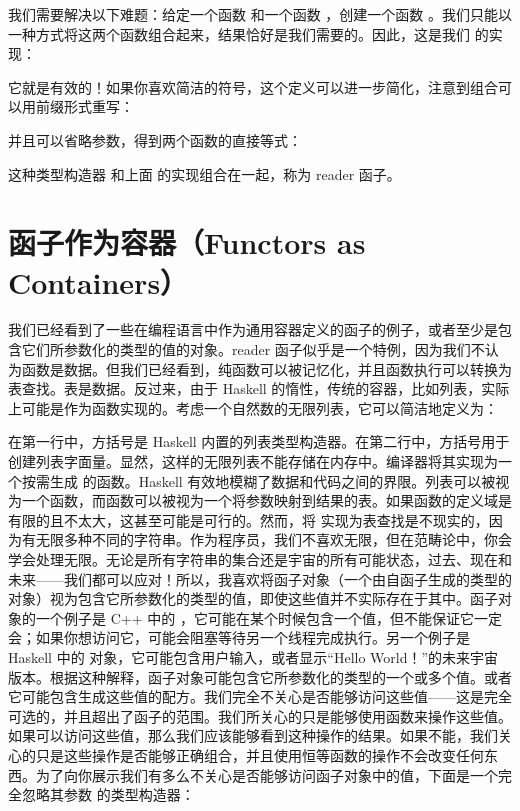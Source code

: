 我们需要解决以下难题：给定一个函数  和一个函数 ，创建一个函数 。我们只能以一种方式将这两个函数组合起来，结果恰好是我们需要的。因此，这是我们  的实现：

它就是有效的！如果你喜欢简洁的符号，这个定义可以进一步简化，注意到组合可以用前缀形式重写：

并且可以省略参数，得到两个函数的直接等式：

这种类型构造器  和上面  的实现组合在一起，称为 reader 函子。

\section{函子作为容器（Functors as Containers）}

我们已经看到了一些在编程语言中作为通用容器定义的函子的例子，或者至少是包含它们所参数化的类型的值的对象。reader 函子似乎是一个特例，因为我们不认为函数是数据。但我们已经看到，纯函数可以被记忆化，并且函数执行可以转换为表查找。表是数据。反过来，由于 Haskell 的惰性，传统的容器，比如列表，实际上可能是作为函数实现的。考虑一个自然数的无限列表，它可以简洁地定义为：

在第一行中，方括号是 Haskell 内置的列表类型构造器。在第二行中，方括号用于创建列表字面量。显然，这样的无限列表不能存储在内存中。编译器将其实现为一个按需生成  的函数。Haskell 有效地模糊了数据和代码之间的界限。列表可以被视为一个函数，而函数可以被视为一个将参数映射到结果的表。如果函数的定义域是有限的且不太大，这甚至可能是可行的。然而，将  实现为表查找是不现实的，因为有无限多种不同的字符串。作为程序员，我们不喜欢无限，但在范畴论中，你会学会处理无限。无论是所有字符串的集合还是宇宙的所有可能状态，过去、现在和未来——我们都可以应对！所以，我喜欢将函子对象（一个由自函子生成的类型的对象）视为包含它所参数化的类型的值，即使这些值并不实际存在于其中。函子对象的一个例子是 C++ 中的 ，它可能在某个时候包含一个值，但不能保证它一定会；如果你想访问它，可能会阻塞等待另一个线程完成执行。另一个例子是 Haskell 中的  对象，它可能包含用户输入，或者显示“Hello World！”的未来宇宙版本。根据这种解释，函子对象可能包含它所参数化的类型的一个或多个值。或者它可能包含生成这些值的配方。我们完全不关心是否能够访问这些值——这是完全可选的，并且超出了函子的范围。我们所关心的只是能够使用函数来操作这些值。如果可以访问这些值，那么我们应该能够看到这种操作的结果。如果不能，我们关心的只是这些操作是否能够正确组合，并且使用恒等函数的操作不会改变任何东西。为了向你展示我们有多么不关心是否能够访问函子对象中的值，下面是一个完全忽略其参数  的类型构造器：

